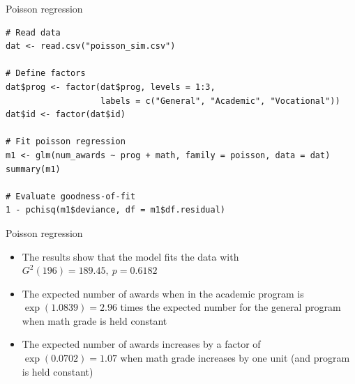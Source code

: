 \documentclass[aspectratio=169]{beamer}
\begin{document}
\begin{frame}[fragile]{Poisson regression}
  \begin{lstlisting}
# Read data
dat <- read.csv("poisson_sim.csv")

# Define factors
dat$prog <- factor(dat$prog, levels = 1:3,
                   labels = c("General", "Academic", "Vocational"))
dat$id <- factor(dat$id)

# Fit poisson regression
m1 <- glm(num_awards ~ prog + math, family = poisson, data = dat)
summary(m1)

# Evaluate goodness-of-fit
1 - pchisq(m1$deviance, df = m1$df.residual)
\end{lstlisting}
\end{frame}

\begin{frame}{Poisson regression}
\begin{itemize}
  \item The results show that the model fits the data with $G^2(196) =
    189.45,~p=0.6182$
  \item The expected number of awards when in the academic program is
    $\exp(1.0839) = 2.96$ times the expected number for the general program
    when math grade is held constant
  \item The expected number of awards increases by a factor of
    $\exp(0.0702) = 1.07$ when math grade increases by one unit (and
    program is held constant)
\end{itemize}
\end{frame}
\end{document}
